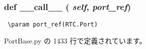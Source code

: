 \subsubsection{\setlength{\rightskip}{0pt plus 5cm}def \_\-\_\-call\_\-\_\- ( {\em self},  {\em port\_\-ref})}\label{classsource__py_1_1_port_base_1_1_port_base_1_1find__port__ref_e844e0019d38360a86bac1474132db3c}




\footnotesize\begin{verbatim}
 \param port_ref(RTC.Port)
\end{verbatim}
\normalsize
 

 PortBase.py の 1433 行で定義されています。
